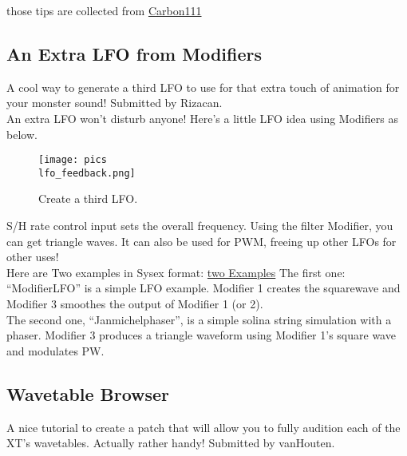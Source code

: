 those tips are collected from \href{https://www.carbon111.com/mwxt.html}{Carbon111}
\subsection{An Extra LFO from Modifiers}
A cool way to generate a third LFO to use for that extra touch of animation for your monster sound! Submitted by Rizacan.\\
An extra LFO won't disturb anyone! Here's a little LFO idea using Modifiers as below.
\bigskip %
%
\begin{figure}[ht!]
	\centering
	\texttt{[image: pics\\lfo\_feedback.png]}
	\caption{Create a third LFO.}
	\label{third_lfo}
\end{figure}
S/H rate control input sets the overall frequency. Using the filter Modifier, you can get triangle waves. It can also be used for PWM, freeing up other LFOs for other uses!\\
Here are Two examples in Sysex format: \href{https://www.carbon111.com/sysex.zip}{two Examples}
The first one: ``ModifierLFO'' is a simple LFO example. Modifier 1 creates the squarewave and Modifier 3 smoothes the output of Modifier 1 (or 2).\\
The second one, ``Janmichelphaser'', is a simple solina string simulation with a phaser. Modifier 3 produces a triangle waveform using Modifier 1's square wave and modulates PW.
\subsection{Wavetable Browser}
A nice tutorial to create a patch that will allow you to fully audition each of the XT's wavetables. Actually rather handy! Submitted by vanHouten.\\
